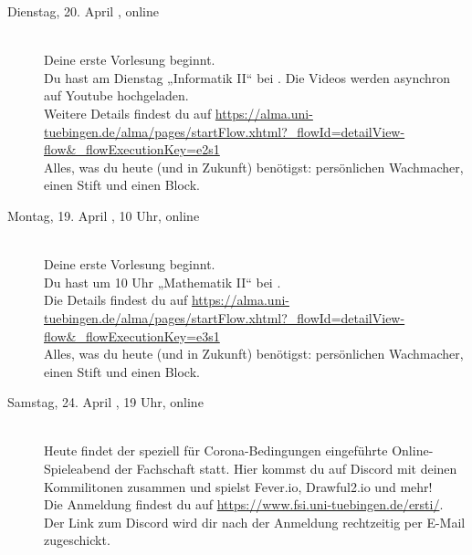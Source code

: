 \begin{description}
\ifbachelor
    \iflehramt
        \item[Dienstag, 20. April \YEAR, online]\ \\
            Deine erste Vorlesung beginnt. \\
            Du hast am Dienstag „Informatik II“ bei \Infoprof. Die Videos werden asynchron auf Youtube hochgeladen.\\
            Weitere Details findest du auf \url{https://alma.uni-tuebingen.de/alma/pages/startFlow.xhtml?_flowId=detailView-flow&_flowExecutionKey=e2s1}\\
            Alles, was du heute (und in Zukunft) benötigst: persönlichen Wachmacher, einen Stift und einen Block. %

    \else
        \item[Montag, 19. April \YEAR, 10 Uhr, online]\ \\
            Deine erste Vorlesung beginnt. \\
            Du hast um 10 Uhr „Mathematik II“ bei \Matheprof.\\
            Die Details findest du auf \url{https://alma.uni-tuebingen.de/alma/pages/startFlow.xhtml?_flowId=detailView-flow&_flowExecutionKey=e3s1}\\
            Alles, was du heute (und in Zukunft) benötigst: persönlichen Wachmacher, einen Stift und einen Block. %

    \fi
\fi

\ifml
\else
    \item[Samstag, 24. April \YEAR, 19 Uhr, online]\ \\
        Heute findet der speziell für Corona-Bedingungen eingeführte Online-Spieleabend der Fachschaft statt. Hier kommst du auf Discord mit deinen Kommilitonen zusammen und spielst Fever.io, Drawful2.io und mehr!\\ 
        Die Anmeldung findest du auf \url{https://www.fsi.uni-tuebingen.de/ersti/}.\\
        Der Link zum Discord wird dir nach der Anmeldung rechtzeitig per E-Mail zugeschickt.
\fi


\end{description}
